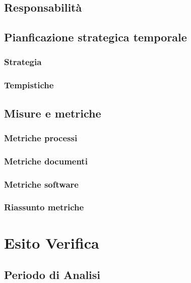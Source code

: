 \documentclass[a4paper, oneside, openany, dvipsnames, table]{article}
\begin{document}
	\subsection{Responsabilità}
		
	\subsection{Pianficazione strategica temporale}
		\subsubsection{Strategia}
			
		\subsubsection{Tempistiche}
			
	\subsection{Misure e metriche}
	\label{sec:metriche}
		
		\subsubsection{Metriche processi}
			
		\subsubsection{Metriche documenti}
			
		\subsubsection{Metriche software}
			
		\subsubsection{Riassunto metriche}
			


\appendix
{}

\newpage
\section{Esito Verifica}
	\label{app:misure}
	\subsection{Periodo di Analisi}
	
\end{document}
